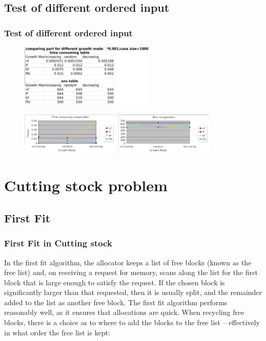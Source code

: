 \documentclass[slidestop,compress,mathserif,brown]{beamer}
\begin{document}
\begin{CJK}{UTF8}{kai}
\subsection{Test of different ordered input}
\begin{frame}
\frametitle{Test of different ordered input}
\begin{figure}
	\begin{center}
	\includegraphics[height = 3cm]{figures/3.png}
	\end{center}
	\begin{center}
	\includegraphics[height = 2cm]{figures/6.png}\quad
	\includegraphics[height = 2cm]{figures/9.png}
	\end{center}
\end{figure}
\end{frame}



\section{Cutting stock problem}
\subsection{First Fit}
\begin{frame}
\frametitle{First Fit in Cutting stock}
In the first fit algorithm, the allocator keeps a list of free blocks (known as the free list) and, on receiving a request for memory, scans along the list for the first block that is large enough to satisfy the request. If the chosen block is significantly larger than that requested, then it is usually split, and the remainder added to the list as another free block.
\newline
The first fit algorithm performs reasonably well, as it ensures that allocations are quick. When recycling free blocks, there is a choice as to where to add the blocks to the free list -- effectively in what order the free list is kept:
\end{frame}


\end{CJK}
\end{document}
